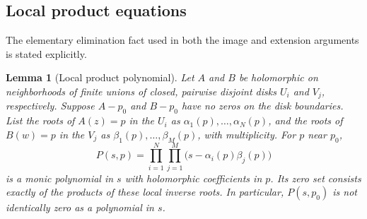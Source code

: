 \documentclass[11pt,reqno]{amsart}
\newtheorem{lemma}[theorem]{Lemma}
\theoremstyle{remark}
\numberwithin{equation}{section}
\begin{document}
\subsection{Local product equations}
The elementary elimination fact used in both the image and extension
arguments is stated explicitly.

\begin{lemma}[Local product polynomial]\label{lem:product}
Let $A$ and $B$ be holomorphic on neighborhoods of finite unions of
closed, pairwise disjoint disks $U_i$ and $V_j$, respectively. Suppose
$A-p_0$ and $B-p_0$ have no zeros on the disk boundaries. List the roots
of $A(z)=p$ in the $U_i$ as $\alpha_1(p),\ldots,\alpha_N(p)$, and the
roots of $B(w)=p$ in the $V_j$ as $\beta_1(p),\ldots,\beta_M(p)$,
with multiplicity. For $p$ near $p_0$,
\begin{equation}\label{eq:productpolynomial}
 P(s,p)=\prod_{i=1}^N\prod_{j=1}^M
       \bigl(s-\alpha_i(p)\beta_j(p)\bigr)
\end{equation}
is a monic polynomial in $s$ with holomorphic coefficients in $p$.
Its zero set consists exactly of the products of these local inverse
roots. In particular, $P(s,p_0)$ is not identically zero as a
polynomial in $s$.
\end{lemma}
\end{document}
